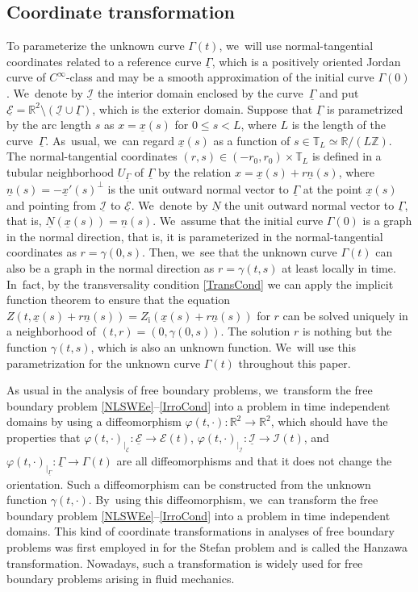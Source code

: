 \documentclass[10pt]{amsart}
\newcommand{\R}{{\mathbb R}}
\newcommand{\cI}{{\mathcal I}}
\newcommand{\cE}{{\mathcal E}}
\newcommand{\ul}[1]{\underline{#1}}
\newcommand{\itGamma}{\mathit{\Gamma}}
\theoremstyle{definition}
\begin{document}
\subsection{Coordinate transformation}\label{subsect:CT}
To parameterize the unknown curve $\itGamma(t)$, we~will use normal-tangential coordinates related to a reference curve $\ul{\itGamma}$,
which is a positively oriented Jordan curve of $C^\infty$-class and may be a smooth approximation of the initial curve $\itGamma(0)$. We~denote by $\ul{\cI}$ the interior domain enclosed by the curve~$\ul{\itGamma}$ and put $\ul{\cE}=\R^2\setminus(\ul{\cI}\cup\ul{\itGamma})$,
which is the exterior domain.
Suppose that $\ul{\itGamma}$ is parametrized by the arc length $s$ as $x = \ul{x}(s)$ for $0\leq s<L$, where $L$ is the length of the curve~$\ul{\itGamma}$. As~usual, we~can regard $\ul{x}(s)$ as a function of $s \in \mathbb{T}_L \simeq \R/(L\mathbb{Z})$.
The normal-tangential coordinates $(r,s)\in(-r_0,r_0)\times\mathbb{T}_L$ is defined in a tubular neighborhood $U_{\ul{\itGamma}}$ of $\ul{\itGamma}$
by the relation $x=\ul{x}(s)+r\ul{n}(s)$,
where $\ul{n}(s)=-\ul{x}'(s)^\perp$ is the unit outward normal vector to $\ul{\itGamma}$ at the point $\ul{x}(s)$ and pointing from $\ul{\cI}$ to $\ul{\cE}$. We~denote by $\ul{N}$ the unit outward normal vector to $\ul{\itGamma}$, that is, $\ul{N}(\ul{x}(s))=\ul{n}(s)$. We~assume that the initial curve $\itGamma(0)$ is a graph in the normal direction, that is,
it is parameterized in the normal-tangential coordinates as $r=\gamma(0,s)$.
Then, we~see that the unknown curve $\itGamma(t)$ can also be a graph in the normal direction as $r=\gamma(t,s)$ at least locally in time. In~fact, by the transversality condition \eqref{TransCond} we can apply the implicit function theorem to ensure that the equation
$Z(t,\ul{x}(s)+r\ul{n}(s)) = Z_\mathrm{i}(\ul{x}(s)+r\ul{n}(s))$ for $r$ can be solved uniquely in a neighborhood of $(t,r)=(0,\gamma(0,s))$.
The solution $r$ is nothing but the function $\gamma(t,s)$, which is also an unknown function. We~will use this parametrization for the unknown curve $\itGamma(t)$ throughout this paper.

As usual in the analysis of free boundary problems, we~transform the free boundary problem \eqref{NLSWEe}--\eqref{IrroCond} into a problem
in time independent domains by using a diffeomorphism $\varphi(t,\cdot):\R^2\to\R^2$, which should have the properties that
$\varphi(t,\cdot)_{\vert_{\ul{\cE}}} : \ul{\cE}\to \cE(t)$, $\varphi(t,\cdot)_{\vert_{\ul{\cI}}} : \ul{\cI}\to \cI(t)$,
and $\varphi(t,\cdot)_{\vert_{\ul{\itGamma}}} : \ul{\itGamma}\to \itGamma(t)$ are all diffeomorphisms and that it does not change the orientation.
Such a diffeomorphism can be constructed from the unknown function $\gamma(t,\cdot)$. By~using this diffeomorphism, we~can transform the free boundary problem \eqref{NLSWEe}--\eqref{IrroCond} into a problem in time independent domains.
This kind of coordinate transformations in analyses of free boundary problems was first employed in \cite{Hanzawa1981} for the Stefan problem
and is called the Hanzawa transformation.
Nowadays, such a transformation is widely used for free boundary problems arising in fluid mechanics.
\end{document}
